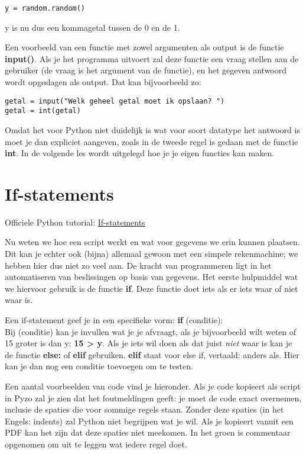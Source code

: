 \begin{lstlisting}[frame=single]
y = random.random() 
\end{lstlisting}

y is nu dus een kommagetal tussen de 0 en de 1. 

Een voorbeeld van een functie met zowel argumenten als output is de functie \textbf{input()}. Als je het programma uitvoert zal deze functie een vraag stellen aan de gebruiker (de vraag is het argument van de functie), en het gegeven antwoord wordt opgeslagen als output. Dat kan bijvoorbeeld zo:
\begin{lstlisting}[frame=single]
getal = input("Welk geheel getal moet ik opslaan? ")
getal = int(getal)
\end{lstlisting}

Omdat het voor Python niet duidelijk is wat voor soort datatype het antwoord is moet je dan expliciet aangeven, zoals in de tweede regel is gedaan met de functie \textbf{int}. In de volgende les wordt uitgelegd hoe je je eigen functies kan maken.

\section{If-statements}
Officiele Python tutorial: \href{https://docs.python.org/3/tutorial/controlflow.html\#if-statements}{If-statements}

Nu weten we hoe een script werkt en wat voor gegevens we erin kunnen plaatsen. Dit kan je echter ook (bijna) allemaal gewoon met een simpele rekenmachine; we hebben hier dus niet zo veel aan. De kracht van programmeren ligt in het automatiseren van beslissingen op basis van gegevens. Het eerste hulpmiddel wat we hiervoor gebruik is de functie \textbf{if}. Deze functie doet iets als er iets waar of niet waar is. 

Een if-statement geef je in een specifieke vorm: \textbf{if} (conditie): \\
Bij (conditie) kan je invullen wat je je afvraagt, als je bijvoorbeeld wilt weten of 15 groter is dan y: \textbf{15 > y}. Als je iets wil doen als dat juist \textit{niet} waar is kan je de functie \textbf{else:} of \textbf{elif} gebruiken. \textbf{elif} staat voor else if, vertaald: anders als. Hier kan je dan nog een conditie toevoegen om te testen.

Een aantal voorbeelden van code vind je hieronder. Als je code kopieert als script in Pyzo zal je zien dat het foutmeldingen geeft: je moet de code exact overnemen, inclusie de spaties die voor sommige regels staan. Zonder deze spaties (in het Engels: indents) zal Python niet begrijpen wat je wil. Als je kopieert vanuit een PDF kan het zijn dat deze spaties niet meekomen. In het groen is commentaar opgenomen om uit te leggen wat iedere regel doet. 

